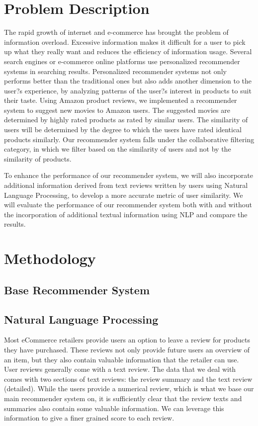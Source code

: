 \documentclass{article} %
\begin{document}
\section{Problem Description}
The rapid growth of internet and e-commerce has brought the problem of information overload. Excessive information makes it difficult for a user to pick up what they really want and reduces the efficiency of information usage. Several search engines or e-commerce online platforms use personalized recommender systems in searching results. Personalized recommender systems not only performs better than the traditional ones but also adds another dimension to the user?s experience, by analyzing patterns of the user?s interest in products to suit their taste. Using Amazon product reviews, we implemented a recommender system to suggest new movies to Amazon users. 
The suggested movies are determined by highly rated products as rated by similar users. The similarity of users will be determined by the degree to which the users have rated identical products similarly. Our recommender system falls under the collaborative filtering category, in which we filter based on the similarity of users and not by the similarity of products.

 To enhance the performance of our recommender system, we will also incorporate additional information derived from text reviews written by users using Natural Language Processing, to develop a more accurate metric of user similarity. We will evaluate the performance of our recommender system both with and without the incorporation of additional textual information using NLP and compare the results.


\section{Methodology}

\subsection{Base Recommender System}

\subsection{Natural Language Processing}

Most eCommerce retailers provide users an option to leave a review for products they have purchased. These reviews not only provide future users an overview of an item, but they also contain valuable information that the retailer can use. User reviews generally come with a text review. The data that we deal with comes with two sections of text reviews: the review summary and the text review (detailed). While the users provide a numerical review, which is what we base our main recommender system on, it is sufficiently clear that the review texts and summaries also contain some valuable information. We can  leverage this information to give a finer grained score to each review. 
\end{document}
